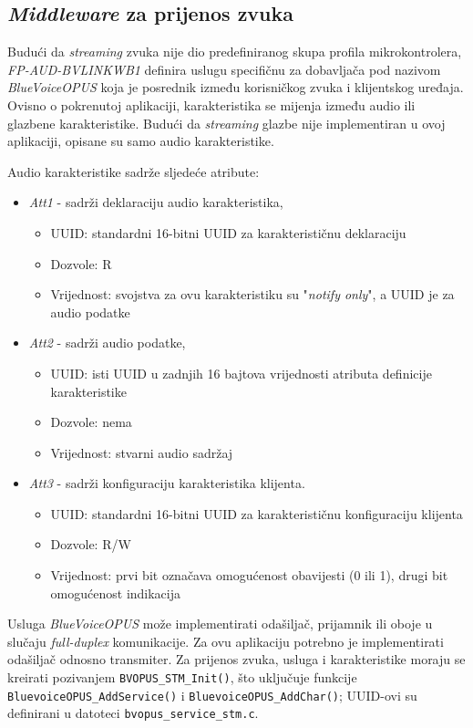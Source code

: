 \subsection{\textit{Middleware} za prijenos zvuka}

Budući da \textit{streaming} zvuka nije dio predefiniranog skupa profila mikrokontrolera, \textit{FP-AUD-BVLINKWB1} definira uslugu specifičnu za dobavljača pod nazivom \textit{BlueVoiceOPUS} koja je posrednik između korisničkog zvuka i  klijentskog uređaja. Ovisno o pokrenutoj aplikaciji, karakteristika se mijenja između audio ili glazbene karakteristike. Budući da \textit{streaming} glazbe nije implementiran u ovoj aplikaciji, opisane su samo audio karakteristike. 

Audio karakteristike sadrže sljedeće atribute:
\begin{itemize}
	\item \textit{Att1} - sadrži deklaraciju audio karakteristika,
	\begin{itemize}
		\item UUID: standardni 16-bitni UUID za karakterističnu deklaraciju
		\item Dozvole: R
		\item Vrijednost: svojstva za ovu karakteristiku su "\textit{notify only}", a UUID je za audio podatke
	\end{itemize}
	\item \textit{Att2} - sadrži audio podatke,
	\begin{itemize}
		\item UUID: isti UUID u zadnjih 16 bajtova vrijednosti atributa definicije karakteristike
		\item Dozvole: nema
		\item Vrijednost: stvarni audio sadržaj
	\end{itemize}
	\item \textit{Att3} - sadrži konfiguraciju karakteristika klijenta.
	\begin{itemize}
		\item UUID: standardni 16-bitni UUID za karakterističnu konfiguraciju klijenta
		\item Dozvole: R/W
		\item Vrijednost: prvi bit označava omogućenost obavijesti (0 ili 1), drugi bit omogućenost indikacija
	\end{itemize}
\end{itemize}

Usluga \textit{BlueVoiceOPUS} može implementirati odašiljač, prijamnik ili oboje u slučaju \textit{full-duplex} komunikacije. Za ovu aplikaciju potrebno je implementirati odašiljač odnosno transmiter.
Za prijenos zvuka, usluga i karakteristike moraju se kreirati pozivanjem \lstinline|BVOPUS_STM_Init()|, što uključuje funkcije \lstinline|BluevoiceOPUS_AddService()| i \lstinline|BluevoiceOPUS_AddChar()|; UUID-ovi su definirani u datoteci \lstinline|bvopus_service_stm.c|.

